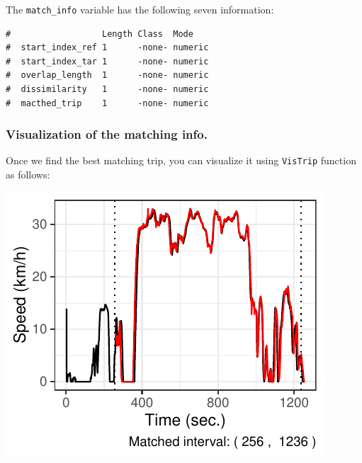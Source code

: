 \documentclass[letterpaper,9pt,twocolumn,twoside,]{pinp}
\begin{document}
The \texttt{match\_info} variable has the following seven information:

\begin{Shaded}
\begin{Highlighting}[]
\end{Highlighting}
\end{Shaded}

\begin{ShadedResult}
\begin{verbatim}
#                  Length Class  Mode   
#  start_index_ref 1      -none- numeric
#  start_index_tar 1      -none- numeric
#  overlap_length  1      -none- numeric
#  dissimilarity   1      -none- numeric
#  macthed_trip    1      -none- numeric
\end{verbatim}
\end{ShadedResult}

\hypertarget{visualization-of-the-matching-info.}{%
\subsubsection{Visualization of the matching
info.}\label{visualization-of-the-matching-info.}}

Once we find the best matching trip, you can visualize it using
\texttt{VisTrip} function as follows:

\begin{Shaded}
\begin{Highlighting}[]
\end{Highlighting}
\end{Shaded}

\begin{center}\includegraphics{report_issaclee_files/figure-latex/sampleresult-1} \end{center}
\end{document}
